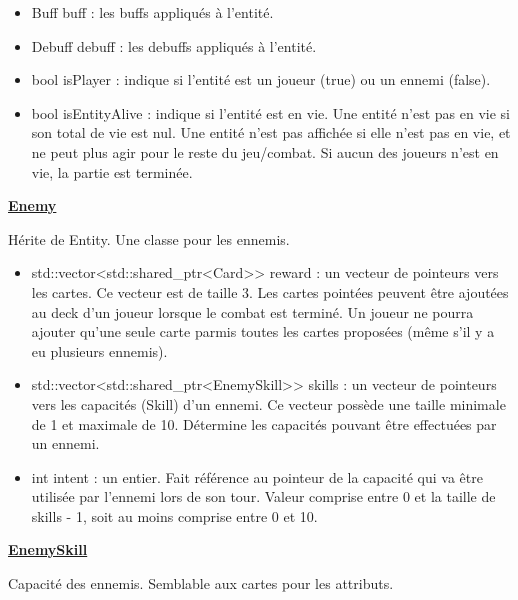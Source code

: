 \begin{itemize}
    \item Buff buff : les buffs appliqués à l'entité.
    \item Debuff debuff : les debuffs appliqués à l'entité.
    \item bool isPlayer : indique si l'entité est un joueur (true) ou un ennemi (false).
    \item bool isEntityAlive : indique si l'entité est en vie. Une entité n'est pas en vie si son total de vie est nul. Une entité n'est pas affichée si elle n'est pas en vie, et ne peut plus agir pour le reste du jeu/combat. Si aucun des joueurs n'est en vie, la partie est terminée.
\end{itemize}


\underline{\textbf{Enemy}}
\par Hérite de Entity. Une classe pour les ennemis. 
\begin{itemize}
    \item std::vector<std::shared\_ptr<Card>> reward : un vecteur de pointeurs vers les cartes. Ce vecteur est de taille 3. Les cartes pointées peuvent être ajoutées au deck d'un joueur lorsque le combat est terminé. Un joueur ne pourra ajouter qu'une seule carte parmis toutes les cartes proposées (même s'il y a eu plusieurs ennemis).
    \item std::vector<std::shared\_ptr<EnemySkill>>  skills : un vecteur de pointeurs vers les capacités (Skill) d'un ennemi. Ce vecteur possède une taille minimale de 1 et maximale de 10. Détermine les capacités pouvant être effectuées par un ennemi.
    \item int intent : un entier. Fait référence au pointeur de la capacité qui va être utilisée par l'ennemi lors de son tour. Valeur comprise entre 0 et la taille de skills - 1, soit au moins comprise entre 0 et 10. 
\end{itemize}

\underline{\textbf{EnemySkill}}
\par Capacité des ennemis. Semblable aux cartes pour les attributs.

